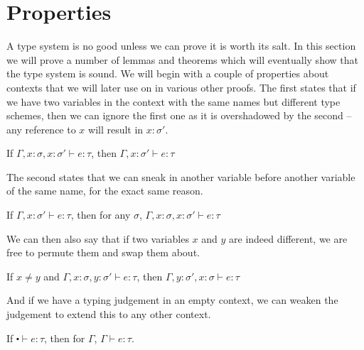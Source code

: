 \chapter{Properties}\label{cha:properties}
A type system is no good unless we can prove it is worth its salt. In
this section we will prove a number of lemmas and theorems which will
eventually show that the type system is sound. We will begin with a
couple of properties about contexts that we will later use on in
various other proofs. The first states that if we have two variables
in the context with the same names but different type schemes, then we
can ignore the first one as it is overshadowed by the second -- any
reference to $x$ will result in $x : \sigma'$.
\begin{lemma}[Drop]\label{lem:drop}
  If $\Gamma , x : \sigma, x : \sigma' \vdash e : \tau$, then $\Gamma , x : \sigma' \vdash e : \tau$
\end{lemma}
The second states that we can sneak in another variable before another
variable of the same name, for the exact same reason.
\begin{lemma}[Sneak]\label{lem:sneak}
  If $\Gamma , x : \sigma' \vdash e : \tau$, then for any $\sigma$, $\Gamma , x : \sigma, x : \sigma' \vdash e : \tau$
\end{lemma}
We can then also say that if two variables $x$ and $y$ are indeed
different, we are free to permute them and swap them about.
\begin{lemma}[Swap]\label{lem:swap}
  If $x \neq y$ and $\Gamma , x : \sigma, y : \sigma' \vdash e : \tau$, then $\Gamma , y : \sigma' , x : \sigma \vdash e
  : \tau$
\end{lemma}
And if we have a typing judgement in an empty context, we can weaken
the judgement to extend this to any other context.
\begin{lemma}[Weaken]\label{lem:weaken}
  If $\centerdot \vdash e : \tau$, then for $\Gamma$, $\Gamma \vdash e : \tau$.
\end{lemma}

